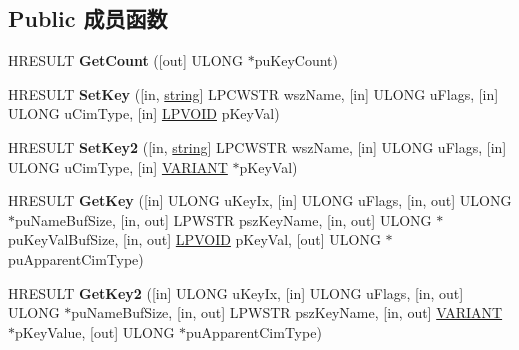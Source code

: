 \subsection*{Public 成员函数}
\begin{DoxyCompactItemize}
\item 
\mbox{\label{interface_i_wbem_path_key_list_ab07f274cc973be844190d21dc7126024}} 
H\+R\+E\+S\+U\+LT {\bfseries Get\+Count} (\mbox{[}out\mbox{]} U\+L\+O\+NG $\ast$pu\+Key\+Count)
\item 
\mbox{\label{interface_i_wbem_path_key_list_a976dd44b0e9c1ea0e7d789c1824a4fe1}} 
H\+R\+E\+S\+U\+LT {\bfseries Set\+Key} (\mbox{[}in, \hyperlink{structstring}{string}\mbox{]} L\+P\+C\+W\+S\+TR wsz\+Name, \mbox{[}in\mbox{]} U\+L\+O\+NG u\+Flags, \mbox{[}in\mbox{]} U\+L\+O\+NG u\+Cim\+Type, \mbox{[}in\mbox{]} \hyperlink{interfacevoid}{L\+P\+V\+O\+ID} p\+Key\+Val)
\item 
\mbox{\label{interface_i_wbem_path_key_list_a0293ec57d4761cabbfd8a200a97023d1}} 
H\+R\+E\+S\+U\+LT {\bfseries Set\+Key2} (\mbox{[}in, \hyperlink{structstring}{string}\mbox{]} L\+P\+C\+W\+S\+TR wsz\+Name, \mbox{[}in\mbox{]} U\+L\+O\+NG u\+Flags, \mbox{[}in\mbox{]} U\+L\+O\+NG u\+Cim\+Type, \mbox{[}in\mbox{]} \hyperlink{structtag_v_a_r_i_a_n_t}{V\+A\+R\+I\+A\+NT} $\ast$p\+Key\+Val)
\item 
\mbox{\label{interface_i_wbem_path_key_list_ae1dc4a9258b032adba98302f0ffbf0f1}} 
H\+R\+E\+S\+U\+LT {\bfseries Get\+Key} (\mbox{[}in\mbox{]} U\+L\+O\+NG u\+Key\+Ix, \mbox{[}in\mbox{]} U\+L\+O\+NG u\+Flags, \mbox{[}in, out\mbox{]} U\+L\+O\+NG $\ast$pu\+Name\+Buf\+Size, \mbox{[}in, out\mbox{]} L\+P\+W\+S\+TR psz\+Key\+Name, \mbox{[}in, out\mbox{]} U\+L\+O\+NG $\ast$pu\+Key\+Val\+Buf\+Size, \mbox{[}in, out\mbox{]} \hyperlink{interfacevoid}{L\+P\+V\+O\+ID} p\+Key\+Val, \mbox{[}out\mbox{]} U\+L\+O\+NG $\ast$pu\+Apparent\+Cim\+Type)
\item 
\mbox{\label{interface_i_wbem_path_key_list_a6c563acfaecff82c98667f008fbf9c53}} 
H\+R\+E\+S\+U\+LT {\bfseries Get\+Key2} (\mbox{[}in\mbox{]} U\+L\+O\+NG u\+Key\+Ix, \mbox{[}in\mbox{]} U\+L\+O\+NG u\+Flags, \mbox{[}in, out\mbox{]} U\+L\+O\+NG $\ast$pu\+Name\+Buf\+Size, \mbox{[}in, out\mbox{]} L\+P\+W\+S\+TR psz\+Key\+Name, \mbox{[}in, out\mbox{]} \hyperlink{structtag_v_a_r_i_a_n_t}{V\+A\+R\+I\+A\+NT} $\ast$p\+Key\+Value, \mbox{[}out\mbox{]} U\+L\+O\+NG $\ast$pu\+Apparent\+Cim\+Type)

\end{DoxyCompactItemize}
